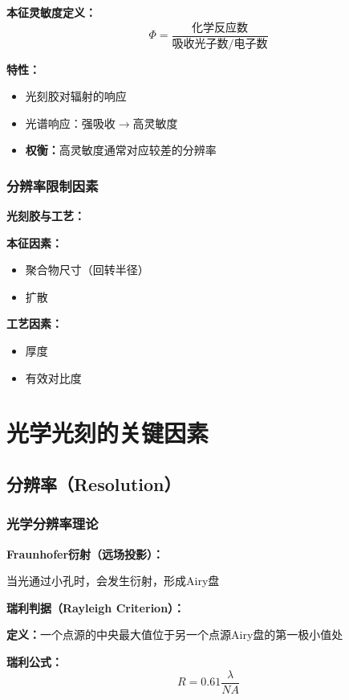 \documentclass[UTF8,12pt,a4paper]{ctexart}
\begin{document}
\textbf{本征灵敏度定义：}
\begin{equation}
\Phi = \frac{\text{化学反应数}}{\text{吸收光子数/电子数}}
\end{equation}

\textbf{特性：}
\begin{itemize}
    \item 光刻胶对辐射的响应
    \item 光谱响应：强吸收$\rightarrow$高灵敏度
    \item \textbf{权衡：}高灵敏度通常对应较差的分辨率
\end{itemize}

\subsubsection{分辨率限制因素}

\textbf{光刻胶与工艺：}

\textbf{本征因素：}
\begin{itemize}
    \item 聚合物尺寸（回转半径）
    \item 扩散
\end{itemize}

\textbf{工艺因素：}
\begin{itemize}
    \item 厚度
    \item 有效对比度
\end{itemize}

\section{光学光刻的关键因素}

\subsection{分辨率（Resolution）}

\subsubsection{光学分辨率理论}

\textbf{Fraunhofer衍射（远场投影）：}

当光通过小孔时，会发生衍射，形成Airy盘

\textbf{瑞利判据（Rayleigh Criterion）：}

\textbf{定义：}一个点源的中央最大值位于另一个点源Airy盘的第一极小值处

\textbf{瑞利公式：}
\begin{equation}
R = 0.61\frac{\lambda}{NA}
\end{equation}
\end{document}
